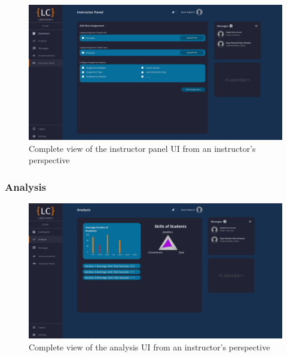 \documentclass[a4paper, 12pt]{article}
\begin{document}
    \begin{figure}[H]
        \centering
        \includegraphics[width=\textwidth]{instructor_admin_panel}
        \caption{Complete view of the instructor panel UI from an instructor's perspective}
        \label{fig:instructor_admin_panel_full}
    \end{figure}
    
    
    
    
    
    
    
    
    
    
    
    
    
    \pagebreak
    
    \subsubsection{Analysis}
    
    \begin{figure}[H]
        \centering
        \includegraphics[width=\textwidth]{instructor_analysis}
        \caption{Complete view of the analysis UI from an instructor's perspective}
        \label{fig:instructor_analysis_full}
    \end{figure}
    
\end{document}
